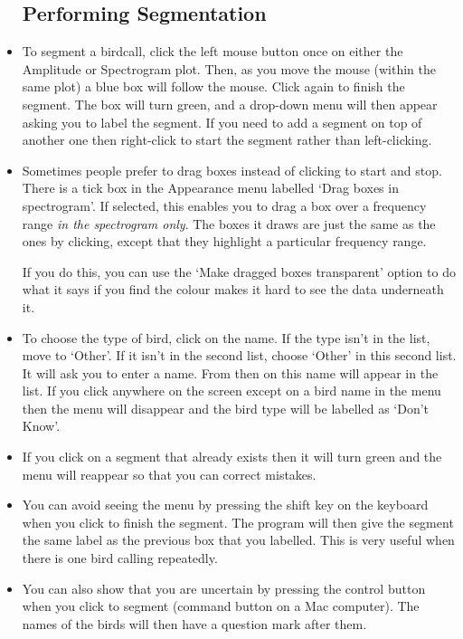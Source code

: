 \documentclass{article}
\begin{document}
\begin{itemize}
\subsection{Performing Segmentation}

\item To segment a birdcall, click the left mouse button once on either the Amplitude or Spectrogram plot. Then, as you move the mouse (within the same plot) a blue box will follow the mouse. Click again to finish the segment. The box will turn green, and a drop-down menu will then appear asking you to label the segment. If you need to add a segment on top of another one then right-click to start the segment rather than left-clicking. 

\item Sometimes people prefer to drag boxes instead of clicking to start and stop. There is a tick box in the Appearance menu labelled `Drag boxes in spectrogram'. If selected, this enables you to drag a box over a frequency range {\em in the spectrogram only}. The boxes it draws are just the same as the ones by clicking, except that they highlight a particular frequency range. 

If you do this, you can use the `Make dragged boxes transparent' option to do what it says if you find the colour makes it hard to see the data underneath it.

\item To choose the type of bird, click on the name. If the type isn't in the list, move to `Other'. If it isn't in the second list, choose `Other' in this second list. It will ask you to enter a name. From then on this name will appear in the list. If you click anywhere on the screen except on a bird name in the menu then the menu will disappear and the bird type will be labelled as `Don't Know'.

\item If you click on a segment that already exists then it will turn green and the menu will reappear so that you can correct mistakes.

\item You can avoid seeing the menu by pressing the shift key on the keyboard when you click to finish the segment. The program will then give the segment the same label as the previous box that you labelled. This is very useful when there is one bird calling repeatedly.

\item You can also show that you are uncertain by pressing the control button when you click to segment (command button on a Mac computer). The names of the birds will then have a question mark after them. 


\end{itemize}
\end{document}

